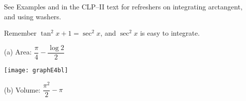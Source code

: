 \begin{hint}
See Examples  and   in the
CLP--II text for refreshers on integrating arctangent, and using washers.

 Remember $\tan^2  x + 1 = \sec^2 x$, and $\sec^2x$ is easy to integrate.
\end{hint}

\begin{answer} (a) Area: $\dfrac{\pi}{4}-\dfrac{\log 2}{2}$
\begin{center}
       \texttt{[image: graphE4bl]}
\end{center}
\noindent (b) Volume: $ \dfrac{\pi^2}{2}-\pi$
\end{answer}

